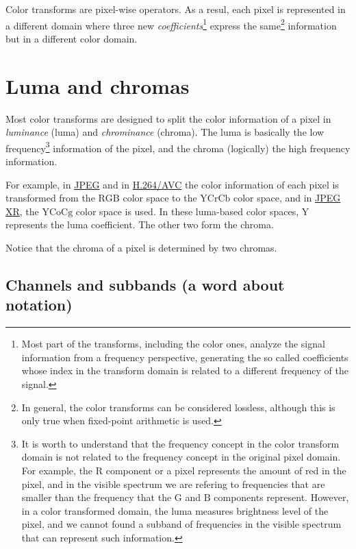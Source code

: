 Color transforms are pixel-wise operators. As a resul, each pixel is
represented in a different domain where three new
\emph{coefficients}\footnote{Most part of the transforms, including
the color ones, analyze the signal information from a frequency
perspective, generating the so called coefficients whose index in the
transform domain is related to a different frequency of the signal.}
express the same\footnote{In general, the color transforms can be
considered lossless, although this is only true when fixed-point
arithmetic is used.} information but in a different color domain.

\section{Luma and chromas}

Most color transforms are designed to split the color information of a
pixel in \emph{luminance} (luma) and \emph{chrominance} (chroma). The
luma is basically the low frequency\footnote{It is worth to understand
  that the frequency concept in the color transform domain is not
  related to the frequency concept in the original pixel domain. For
  example, the $\text{R}$ component or a pixel represents the amount
  of red in the pixel, and in the visible spectrum we are refering to
  frequencies that are smaller than the frequency that the $\text{G}$
  and $\text{B}$ components represent. However, in a color transformed
  domain, the luma measures brightness level of the pixel, and we
  cannot found a subband of frequencies in the visible spectrum that
  can represent such information.} information of the pixel, and the
chroma (logically) the high frequency information.

For example, in
\href{https://en.wikipedia.org/wiki/JPEG#JPEG_codec_example}{JPEG} and
in
\href{https://en.wikipedia.org/wiki/Advanced_Video_Coding#Fidelity_range_extensions_and_professional_profiles}{H.264/AVC}
the color information of each pixel is transformed from the
$\text{RGB}$ color space to the $\text{YCrCb}$ color space, and in
\href{https://en.wikipedia.org/wiki/JPEG_XR#Description}{JPEG XR}, the
$\text{YCoCg}$ color space is used. In these luma-based color spaces,
$\text{Y}$ represents the luma coefficient. The other two form the
chroma.

Notice that the chroma of a pixel is determined by two chromas.

\subsection*{Channels and subbands (a word about notation)}

